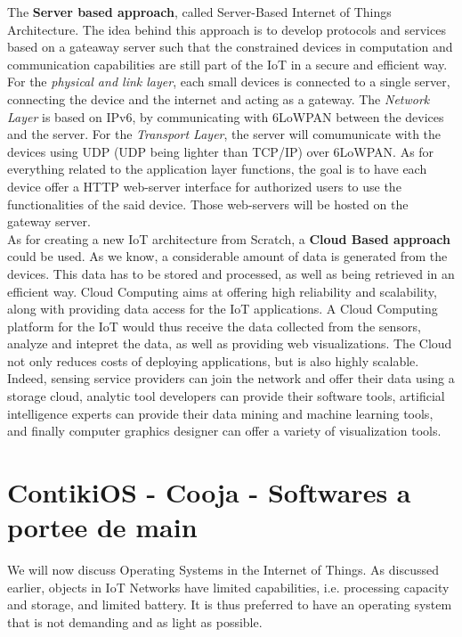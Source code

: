 The \textbf{Server based approach}, called Server-Based Internet of Things Architecture. The idea behind this approach is to develop protocols and services based on a gateaway server such that the constrained devices in computation and communication capabilities are still part of the IoT in a secure and efficient way. For the \textit{physical and link layer}, each small devices is connected to a single server, connecting the device and the internet and acting as a gateway. The \textit{Network Layer} is based on IPv6, by communicating with 6LoWPAN between the devices and the server. For the \textit{Transport Layer}, the server will comumunicate with the devices using UDP (UDP being lighter than TCP/IP) over 6LoWPAN. As for everything related to the application layer functions, the goal is to have each device offer a HTTP web-server interface for authorized users to use the functionalities of the said device. Those web-servers will be hosted on the gateway server.\\

As for creating a new IoT architecture from Scratch, a \textbf{Cloud Based approach} could be used. As we know, a considerable amount of data is generated from the devices. This data has to be stored and processed, as well as being retrieved in an efficient way. Cloud Computing aims at offering high reliability and scalability, along with providing data access for the IoT applications. A Cloud Computing platform for the IoT would thus receive the data collected from the sensors, analyze and intepret the data, as well as providing web visualizations. The Cloud not only reduces costs of deploying applications, but is also highly scalable. Indeed, sensing service providers can join the network and offer their data using a storage cloud, analytic tool developers can provide their software tools, artificial intelligence experts can provide their data mining and machine learning tools, and finally computer graphics designer can offer a variety of visualization tools.




\chapter{ContikiOS - Cooja - Softwares a portee de main}

We will now discuss Operating Systems in the Internet of Things. As discussed earlier, objects in IoT Networks have limited capabilities, i.e. processing capacity and storage, and limited battery. It is thus preferred to have an operating system that is not demanding and as light as possible. \\

